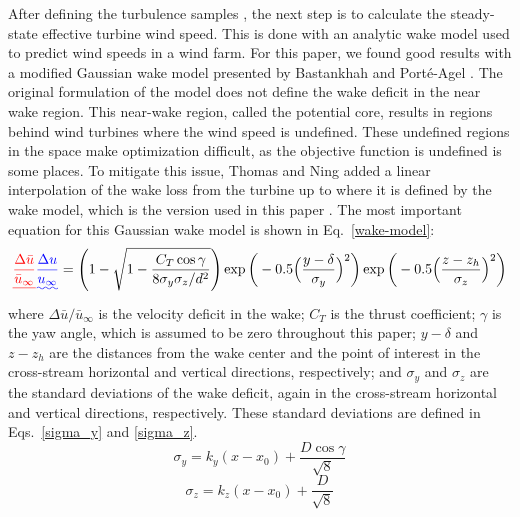 \documentclass[11pt,letterpaper]{article}
\providecommand{\DIFadd}[1]{{\protect\color{blue}\uwave{#1}}} %
\providecommand{\DIFdel}[1]{{\protect\color{red}\sout{#1}}}                      %
\providecommand{\DIFaddbegin}{} %
\providecommand{\DIFaddend}{} %
\providecommand{\DIFdelbegin}{} %
\providecommand{\DIFdelend}{} %
\newcommand{\DIFscaledelfig}{0.5}
\newlength{\DIFdelgraphicswidth} %
\newlength{\DIFdelgraphicsheight} %
\newcommand{\DIFaddincludegraphics}[2][]{{\color{blue}\fbox{\DIFOincludegraphics[#1]{#2}}}} %
\newcommand{\DIFdelincludegraphics}[2][]{%
\sbox{\DIFdelgraphicsbox}{\DIFOincludegraphics[#1]{#2}}%
\settoboxwidth{\DIFdelgraphicswidth}{\DIFdelgraphicsbox} %
\settoboxtotalheight{\DIFdelgraphicsheight}{\DIFdelgraphicsbox} %
\scalebox{\DIFscaledelfig}{%
\parbox[b]{\DIFdelgraphicswidth}{\usebox{\DIFdelgraphicsbox}\\[-\baselineskip] \rule{\DIFdelgraphicswidth}{0em}}\llap{\resizebox{\DIFdelgraphicswidth}{\DIFdelgraphicsheight}{%
\setlength{\unitlength}{\DIFdelgraphicswidth}%
\begin{picture}(1,1)%
\thicklines\linethickness{2pt} %
{\color[rgb]{1,0,0}\put(0,0){\framebox(1,1){}}}%
{\color[rgb]{1,0,0}\put(0,0){\line( 1,1){1}}}%
{\color[rgb]{1,0,0}\put(0,1){\line(1,-1){1}}}%
\end{picture}%
}\hspace*{3pt}}} %
} %
\DeclareRobustCommand{\DIFaddbegin}{\DIFOaddbegin \let\includegraphics\DIFaddincludegraphics} %
\DeclareRobustCommand{\DIFaddend}{\DIFOaddend \let\includegraphics\DIFOincludegraphics} %
\DeclareRobustCommand{\DIFdelbegin}{\DIFOdelbegin \let\includegraphics\DIFdelincludegraphics} %
\DeclareRobustCommand{\DIFdelend}{\DIFOaddend \let\includegraphics\DIFOincludegraphics} %
\begin{document}
\DIFdelend \DIFaddbegin \label{sec:windspeed}
\DIFaddend After defining the turbulence samples \DIFaddbegin \DIFadd{and loads surrogates}\DIFaddend , the next step is to calculate the steady-state effective turbine wind speed. This is done with an analytic wake model used to predict wind speeds in a wind farm. For this paper, we found good results with a modified Gaussian wake model presented by Bastankhah and Porté-Agel \cite{bastankhah2016experimental}.
% 
The original formulation of the model does not define the wake deficit in the near wake region. This near-wake region, called the potential core, results in regions behind wind turbines where the wind speed is undefined. These undefined regions in the space make optimization difficult, as the objective function is undefined is some places. To mitigate this issue, Thomas and Ning added a linear interpolation of the wake loss from the turbine up to where it is defined by the wake model, which is the version used in this paper \cite{Thomas2018}. 
The most important equation for this Gaussian wake model is shown in Eq.~\ref{wake-model}:
% 
\begin{equation}
    \label{wake-model}
    \DIFdelbegin \DIFdel{\frac{\Delta\bar{u}}{\bar{u}_{\infty}} }\DIFdelend \DIFaddbegin \DIFadd{\frac{\Delta u}{u_{\infty}} }\DIFaddend = \Bigg(1 - \sqrt{1 - \frac{C_T \cos{\gamma}}{8\sigma_y\sigma_z/d^2}}  \Bigg) \exp{\bigg(-0.5\Big(\frac{y-\delta}{\sigma_y} \Big)^2}\bigg) \exp{\bigg(-0.5\Big(\frac{z-z_h}{\sigma_z} \Big)^2}\bigg)
\end{equation}
%
\noindent where \DIFdelbegin \DIFdel{$\Delta\bar{u}/\bar{u}_{\infty}$ }\DIFdelend \DIFaddbegin \DIFadd{$\Delta u/u_{\infty}$ }\DIFaddend is the velocity deficit in the wake; $C_T$ is the thrust coefficient; $\gamma$ is the yaw angle, which is assumed to be zero throughout this paper; $y-\delta$ and $z-z_h$ are the distances from the wake center and the point of interest in the cross-stream horizontal and vertical directions, respectively; and $\sigma_y$ and $\sigma_z$ are the standard deviations of the wake deficit, again in the cross-stream horizontal and vertical directions, respectively. These standard deviations are defined in Eqs.~\ref{sigma_y} and \ref{sigma_z}.
%
\begin{equation}
    \label{sigma_y}
    \sigma_y = k_y(x-x_0) + \frac{D\cos{\gamma}}{\sqrt{8}}
\end{equation}
%
\begin{equation}
    \label{sigma_z}
    \sigma_z = k_z(x-x_0) + \frac{D}{\sqrt{8}}
\end{equation}
\end{document}
